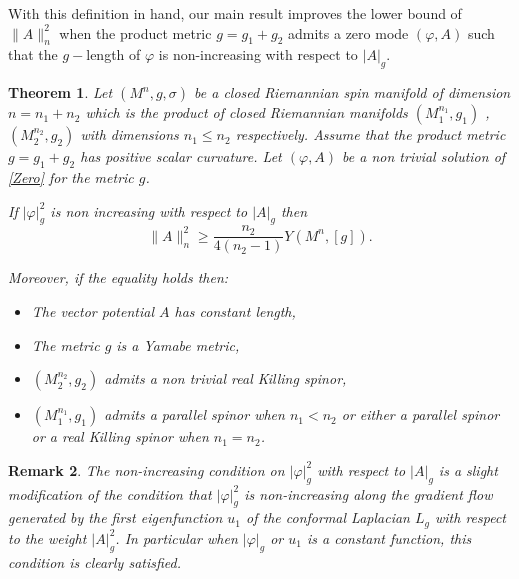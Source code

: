 \documentclass[11pt]{amsart}
\newtheorem{theorem}{Theorem}[section]
\theoremstyle{plain}
\newtheorem{remark}[theorem]{Remark}
\numberwithin{equation}{section}
\theoremstyle{plain}
\begin{document}
With this definition in hand, our main result improves the lower bound of $\parallel A\parallel_n^2$ when  the product metric $g=g_1+g_2$ admits a zero mode $(\varphi,A)$ such that the $g-$length of $\varphi$ is non-increasing with respect to $|A|_g$. 

\begin{theorem}
Let $(M^n,g,\sigma)$ be a closed Riemannian spin manifold of dimension $n=n_1+n_2$ which is the product of closed Riemannian manifolds $(M_1^{n_1},g_1)$ ,$(M_2^{n_2},g_2)$ with dimensions $n_1\leq n_2$ respectively. Assume that the product metric $g=g_1+g_2$ has positive scalar curvature. Let $(\varphi,A)$ be a non trivial solution of \eqref{Zero} for the metric $g$.

If $|\varphi|^2_g$ is non increasing with respect to $|A|_g$ then 
\begin{equation}\label{inequality1}
\parallel A\parallel_n^2\geq \frac{n_2}{4(n_2-1)}Y(M^n,[g]).
\end{equation}

Moreover, if the equality holds then: 
\begin{itemize}
\item [(a)] The vector potential $A$ has constant length,
\item [(b)] The metric $g$ is a Yamabe metric,
\item [(c)] $(M_2^{n_2},g_2)$ admits a non trivial real Killing spinor,
\item [(d)] $(M_1^{n_1},g_1)$ admits a parallel spinor when $n_1<n_2$
or either a parallel spinor or a real Killing spinor when $n_1=n_2$.
\end{itemize}

\end{theorem}

\begin{remark}
The non-increasing condition on $|\varphi|^2_g$ with respect to $|A|_g$ is a slight modification of the condition that $|\varphi|_g^2$ is non-increasing along the gradient flow generated by the first eigenfunction $u_1$ of the conformal Laplacian $L_g$ with respect to the weight $|A|_g^2$. In particular when $|\varphi|_g$ or $u_1$ is a constant function, this condition is clearly satisfied.
\end{remark}
\end{document}
